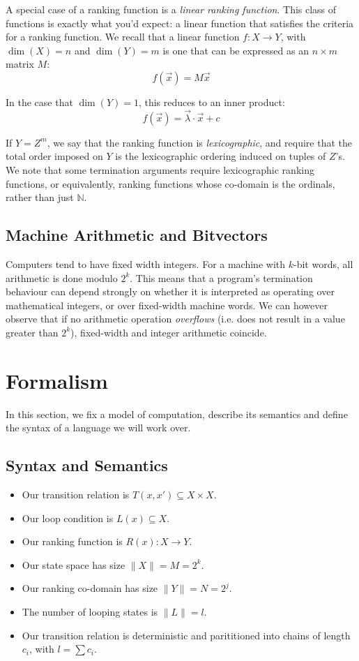 \documentclass[preprint]{sigplanconf}
\theoremstyle{definition}
\begin{document}
A special case of a ranking function is a \emph{linear ranking function}.  This
class of functions is exactly what you'd expect: a linear function that satisfies
the criteria for a ranking function.  We recall that a linear function $f: X \to Y$,
with $\dim(X) = n$ and $\dim(Y) = m$
is one that can be expressed as an $n \times m$ matrix $M$:
$$f(\vec{x}) = M\vec{x}$$

In the case that $\dim(Y) = 1$, this reduces to an inner product:
$$f(\vec{x}) = \vec{\lambda} \cdotp \vec{x} + c$$

If $Y = Z^m$, we say that the ranking function is \emph{lexicographic},
and require that the total order imposed on $Y$ is the lexicographic ordering
induced on tuples of $Z$'s.  We note that some termination arguments
require lexicographic ranking functions, or equivalently, ranking functions
whose co-domain is the ordinals, rather than just $\mathbb{N}$.

\subsection{Machine Arithmetic and Bitvectors}
Computers tend to have fixed width integers.  For a machine with $k$-bit words,
all arithmetic is done modulo $2^k$.  This means that a program's termination
behaviour can depend strongly on whether it is interpreted as operating over
mathematical integers, or over fixed-width machine words.  We can however
observe that if no arithmetic operation \emph{overflows} (i.e. does not result
in a value greater than $2^k$), fixed-width and integer arithmetic coincide.


\section{Formalism}
In this section, we fix a model of computation, describe its semantics and
define the syntax of a language we will work over.

\subsection{Syntax and Semantics}

\begin{itemize}
 \item Our transition relation is $T(x, x') \subseteq X \times X$.
 \item Our loop condition is $L(x) \subseteq X$.
 \item Our ranking function is $R(x) : X \to Y$.
 \item Our state space has size $\| X \| = M = 2^k$.
 \item Our ranking co-domain has size $\| Y \| = N = 2^j$.
 \item The number of looping states is $\| L \| = l$.
 \item Our transition relation is deterministic and parititioned into chains of length $c_i$, with $l = \sum c_i$.
\end{itemize}
\end{document}
